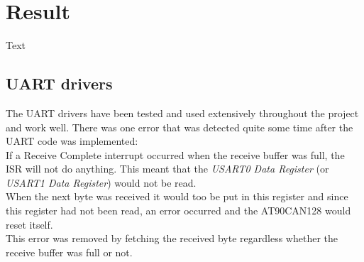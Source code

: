 \section{Result}\label{sec:result}
Text


\subsection{UART drivers}
The UART drivers have been tested and used extensively throughout the project and work well. There was one error that was detected quite some time after the UART code was implemented: \\
If a Receive Complete interrupt occurred when the receive buffer was full, the ISR will not do anything. This meant that the \emph{USART0 Data Register} (or \emph{USART1 Data Register}) would not be read. \\
When the next byte was received it would too be put in this register and since this register had not been read, an error occurred and the AT90CAN128 would reset itself. \\
This error was removed by fetching the received byte regardless whether the receive buffer was full or not.